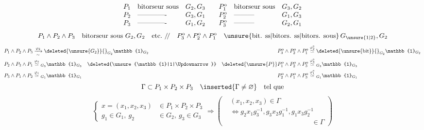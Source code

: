 \[
\begin{array}{lll@{\qquad}lll}
 P_1&\text{bitorseur sous}&G_2,G_3&P_1^{\mathrm o}&\text{bitorseur sous}&G_3,G_2\\
 P_2&\text{-------------}&G_3,G_1&P_2^{\mathrm o}&\text{---------}&G_1,G_3\\
 P_3&\text{-------------}&G_1,G_2&P_3^{\mathrm o}&\text{---------}&G_2,G_1
\end{array}
\]
\[
 P_1\wedge P_2\wedge P_3\quad\text{bitorseur sous }G_2,G_2\quad\text{etc.}\ /\!/\quad
 P_3^{\mathrm o}\wedge P_2^{\mathrm o}\wedge P_1^{\mathrm o}\quad\text{\unsure{bit. ss|bitors. ss|bitors. sous}}\,G_{\unsure{1|2}},G_2
\]
\[
\begin{aligned}
 P_1\wedge P_2\wedge P_3&\xrightarrow[\sim]{\varphi_2}\deleted{\unsure{G_2}}{}_{G_2}\mathbb{1}_{G_2}
 &P_3^{\mathrm o}\wedge P_2^{\mathrm o}\wedge P_1^{\mathrm o}&\overset{\varphi_2^{\mathrm o}}{\simeq}\deleted{\unsure{\operatorname{bit}}}{}_{G_2}\mathbb{1}_{G_2}\\
 P_2\wedge P_3\wedge P_1&\overset{\varphi_3}{\simeq}{}_{G_3}\mathbb{1}_{G_3}
 \quad\deleted{\unsure{\mathbb{1}|1|\Updownarrow}}&\deleted{\unsure{P}}P_1^{\mathrm o}\wedge P_2^{\mathrm o}\wedge P_3^{\mathrm o}&\overset{\varphi_3^{\mathrm o}}{\simeq}{}_{G_3}\mathbb{1}_{G_3}\\
 P_3\wedge P_1\wedge P_2&\overset{\varphi_1}{\simeq}{}_{G_1}\mathbb{1}_{G_1}
 &P_2^{\mathrm o}\wedge P_1^{\mathrm o}\wedge P_3^{\mathrm o}&\overset{\varphi_1^{\mathrm o}}{\simeq}{}_{G_1}\mathbb{1}_{G_1}
\end{aligned}
\]
\[
 \Gamma\subset P_1\times P_2\times P_3\quad\inserted{\Gamma\ne\varnothing}\quad\text{tel que}
\]
\[
 \left\{\begin{aligned}
 x=(x_1,x_2,x_3)&\in P_1\times P_2\times P_3\\
 g_1\in G_1,\ g_2&\in G_2,\ g_3\in G_3
 \end{aligned}\right.
 \Rightarrow\left(\begin{aligned}
 &(x_1,x_2,x_3)\in \Gamma\\
 &\Longleftrightarrow g_2x_1g_3^{-1},g_3x_2g_1^{-1},g_1x_3g_2^{-1}\\
 &\hspace{12em}\in \Gamma
 \end{aligned}\right)
 \tag*{(A)}
\]
